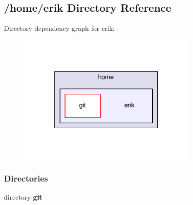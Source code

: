 \subsection{/home/erik Directory Reference}
\label{dir_cf764c42155f97c8834fa9e0239058a2}
Directory dependency graph for erik\+:
\nopagebreak
\begin{figure}[H]
\begin{center}
\leavevmode
\includegraphics[width=254pt]{dir_cf764c42155f97c8834fa9e0239058a2_dep}
\end{center}
\end{figure}
\subsubsection*{Directories}
\begin{DoxyCompactItemize}
\item 
directory {\bf git}
\end{DoxyCompactItemize}
